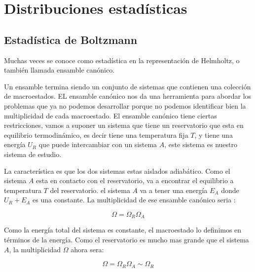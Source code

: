 \documentclass[11pt,fleqn]{book}
\begin{document}


\chapter{Distribuciones estadísticas}

\section{Estadística de Boltzmann}

Muchas veces se conoce como estadística en la representación de Helmholtz, o también llamada ensamble canónico.

Un ensamble termina siendo un conjunto de sistemas que contienen una colección de macroestados. EL ensamble canónico nos da una herramienta para abordar los problemas que ya no podemos desarrollar porque no podemos identificar bien la multiplicidad de cada macroestado. El ensamble canónico tiene ciertas restricciones, vamos a suponer un sistema que tiene un reservatorio que esta en equilibrio termodinámico, es decir tiene una temperatura fija $T$, y tiene una energía $U_{R}$ que puede intercambiar con un sistema $A$, este sistema es nuestro sistema de estudio. 


La característica es que los dos sistemas estas aislados adiabático. Como el sistema $A$ esta en contacto con el reservatorio, va a encontrar el equilibrio a temperatura $T$ del reservatorio. el sistema $A$ va a tener una energía $E_{A}$ donde $U_{R}+E_{A}$ es una constante. La multiplicidad de ese ensamble canónico seria :

\begin{equation*}
    \Omega=\Omega_{R}\Omega_{A}
\end{equation*}

Como la energía total del sistema es constante, el macroestado lo definimos en términos de la energía. Como el reservatorio es mucho mas grande que el sistema $A$, la multiplicidad $\Omega$ ahora sera: 

\begin{equation*}
    \Omega=\Omega_{R}\Omega_{A}\sim\Omega_{R}
\end{equation*}
\end{document}

